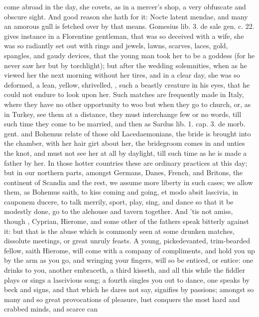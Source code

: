 come abroad in the day, she covets, as in a mercer's shop, a very
obfuscate and obscure sight. And good reason she hath for it: Nocte
latent mendae, and many an amorous gull is fetched over by that means.
Gomesius lib. 3. de sale gen. c. 22. gives instance in a Florentine
gentleman, that was so deceived with a wife, she was so radiantly set
out with rings and jewels, lawns, scarves, laces, gold, spangles, and
gaudy devices, that the young man took her to be a goddess (for he
never saw her but by torchlight); but after the wedding solemnities,
when as he viewed her the next morning without her tires, and in a
clear day, she was so deformed, a lean, yellow, shrivelled, \etc{}, such a
beastly creature in his eyes, that he could not endure to look upon
her. Such matches are frequently made in Italy, where they have no
other opportunity to woo but when they go to church, or, as in
Turkey, see them at a distance, they must interchange few or no words,
till such time they come to be married, and then as Sardus lib. 1. cap.
3. de morb. gent. and Bohemus relate of those old Lacedaemonians,
the bride is brought into the chamber, with her hair girt about her,
the bridegroom comes in and unties the knot, and must not see her at
all by daylight, till such time as he is made a father by her. In those
hotter countries these are ordinary practices at this day; but in our
northern parts, amongst Germans, Danes, French, and Britons, the
continent of Scandia and the rest, we assume more liberty in such
cases; we allow them, as Bohemus saith, to kiss coming and going, et
modo absit lascivia, in cauponem ducere, to talk merrily, sport, play,
sing, and dance so that it be modestly done, go to the alehouse and
tavern together. And 'tis not amiss, though  \Chrysostom{}, Cyprian,
Hierome, and some other of the fathers speak bitterly against it: but
that is the abuse which is commonly seen at some drunken matches,
dissolute meetings, or great unruly feasts. A young,
pickedevanted, trim-bearded fellow, saith Hierome, will come with a
company of compliments, and hold you up by the arm as you go, and
wringing your fingers, will so be enticed, or entice: one drinks to
you, another embraceth, a third kisseth, and all this while the fiddler
plays or sings a lascivious song; a fourth singles you out to dance,
one speaks by beck and signs, and that which he dares not say,
signifies by passions; amongst so many and so great provocations of
pleasure, lust conquers the most hard and crabbed minds, and scarce can
